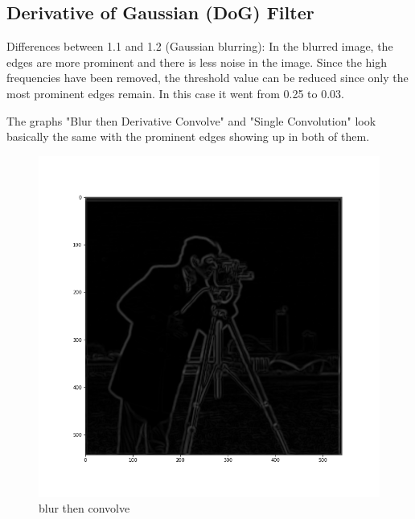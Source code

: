 \documentclass{article}
\begin{document}
\subsection{Derivative of Gaussian (DoG) Filter}
Differences between 1.1 and 1.2 (Gaussian blurring): In the blurred image, the edges are more prominent and there is less noise in the image. Since the high frequencies have been removed, the threshold value can be reduced since only the most prominent edges remain. In this case it went from 0.25 to 0.03.

The graphs "Blur then Derivative Convolve" and "Single Convolution" look basically the same with the prominent edges showing up in both of them.


\begin{figure}[!htb]
    \includegraphics[width=\linewidth]{blur then convolve.png}
    \caption{blur then convolve}\label{fig:awesome_image1}
\endminipage
{}

\end{figure}
\end{document}
